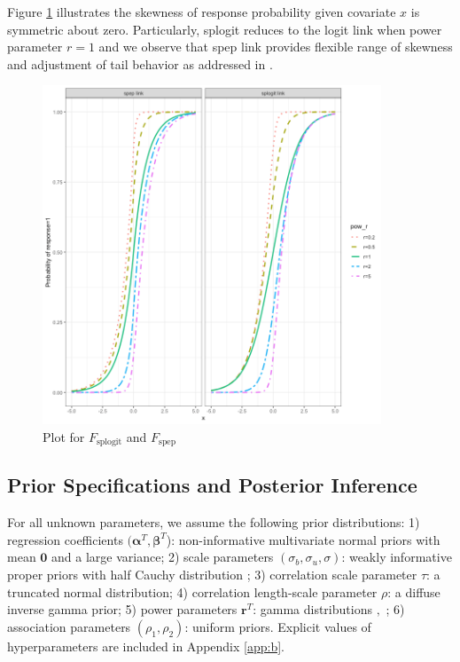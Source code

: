Figure \ref{fig:Chp2_cdf_sp} illustrates the skewness of response probability given covariate $x$ is symmetric about zero. Particularly, splogit reduces to the logit link when power parameter $r=1$ and we observe that spep link provides flexible range of skewness and adjustment of tail behavior as addressed in \cite{Jiang2013}. 

\begin{figure}[H]
\centering
\includegraphics[width=0.9\textwidth]{Figures/Chp2_cdf_sp.png}
\caption{Plot for $F_{\mbox{splogit}}$ and $F_{\mbox{spep}}$}
\label{fig:Chp2_cdf_sp}
\end{figure}

\subsection{Prior Specifications and Posterior Inference}\label{sec:chp2_prior}

For all unknown parameters, we assume the following prior distributions: 1) regression coefficients $(\bm{\alpha}^T, \bm{\beta}^T$): non-informative multivariate normal priors with mean $\bm{0}$ and a large variance; 2) scale parameters $(\sigma_b,\sigma_u,\sigma)$: weakly informative proper priors with half Cauchy distribution \cite{Gelman2006}; 3) correlation scale parameter $\tau$: a truncated normal distribution; 4) correlation length-scale parameter $\rho$: a diffuse inverse gamma prior; 5) power parameters $\bm{r}^T$: gamma distributions \cite{Jiang2013}$,$ \cite{Upadhyay2015}; 6) association parameters $(\rho_1, \rho_2)$: uniform priors. Explicit values of hyperparameters are included in Appendix \ref{app:b}.

